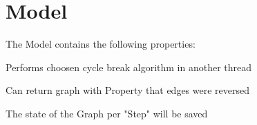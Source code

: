 \section{Model}
The Model contains the following properties:
\begin{list}{-}{}
\item Performs choosen cycle break algorithm in another thread
\item Can return graph with Property that edges were reversed
\item The state of the Graph per "Step" will be saved

\end{list}


